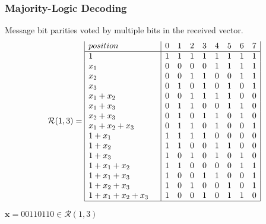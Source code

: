 \documentclass{beamer}
\newcommand{\RM}[2]{\ensuremath{\mathcal{R}(#1,#2)}}
\newcommand{\V}[1]{\ensuremath{\mathbf{#1}}}
\begin{document}
\begin{frame}
\frametitle{Majority-Logic Decoding}
Message bit parities voted by multiple bits in the received vector.
 \begin{equation}

\RM{1}{3} = \begin{array}{|l|cccccccc|}
  position &     0&1&2&3&4&5&6&7 \\
\hline
1 \quad&  	 1&1&1&1&1&1&1&1 \\
x_1 \quad& 	 0&0&0&0&1&1&1&1 \\
x_2 \quad& 	 0&0&1&1&0&0&1&1 \\
x_3 \quad&	 0&1&0&1&0&1&0&1 \\
x_1+x_2 \quad&    0&0&1&1&1&1&0&0 \\
x_1+x_3 \quad&	 0&1&1&0&0&1&1&0 \\
x_2+x_3 \quad&	 0&1&0&1&1&0&1&0 \\
x_1+x_2+x_3 \quad& 0&1&1&0&1&0&0&1 \\
1+x_1	\quad&	 1&1&1&1&0&0&0&0 \\
1+x_2	\quad&	 1&1&0&0&1&1&0&0 \\
1+x_3	\quad&	 1&0&1&0&1&0&1&0 \\
1+x_1+x_2 \quad&	 1&1&0&0&0&0&1&1 \\
1+x_1+x_3 \quad&	 1&0&0&1&1&0&0&1 \\
1+x_2+x_3 \quad&	 1&0&1&0&0&1&0&1 \\
1+x_1+x_2+x_3\quad& 1&0&0&1&0&1&1&0 \\
\hline
\end{array}
\end{equation}



\begin{example}
$\V{x} = 00110110 \in \RM{1}{3}$

\end{example}

\end{frame}


\end{document}
